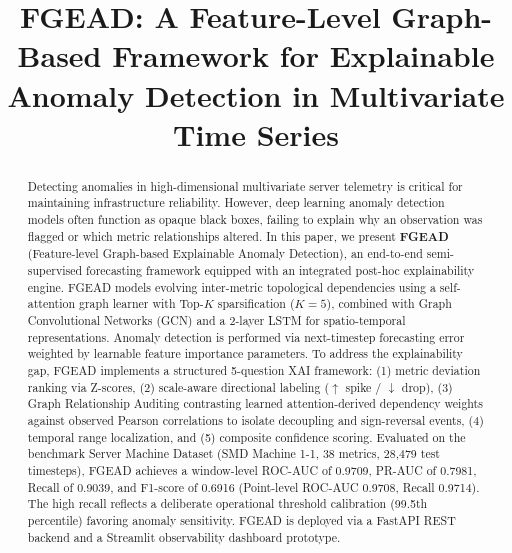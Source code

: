 \documentclass[conference]{IEEEtran}
\begin{document}
\title{FGEAD: A Feature-Level Graph-Based Framework for Explainable Anomaly Detection in Multivariate Time Series}

\author{
\and
{}
\and
{}
}
\maketitle

\begin{abstract}
Detecting anomalies in high-dimensional multivariate server telemetry is critical for maintaining infrastructure reliability. However, deep learning anomaly detection models often function as opaque black boxes, failing to explain why an observation was flagged or which metric relationships altered. In this paper, we present \textbf{FGEAD} (Feature-level Graph-based Explainable Anomaly Detection), an end-to-end semi-supervised forecasting framework equipped with an integrated post-hoc explainability engine. FGEAD models evolving inter-metric topological dependencies using a self-attention graph learner with Top-$K$ sparsification ($K=5$), combined with Graph Convolutional Networks (GCN) and a 2-layer LSTM for spatio-temporal representations. Anomaly detection is performed via next-timestep forecasting error weighted by learnable feature importance parameters. To address the explainability gap, FGEAD implements a structured 5-question XAI framework: (1) metric deviation ranking via Z-scores, (2) scale-aware directional labeling ($\uparrow$ spike / $\downarrow$ drop), (3) Graph Relationship Auditing contrasting learned attention-derived dependency weights against observed Pearson correlations to isolate decoupling and sign-reversal events, (4) temporal range localization, and (5) composite confidence scoring. Evaluated on the benchmark Server Machine Dataset (SMD Machine 1-1, 38 metrics, 28,479 test timesteps), FGEAD achieves a window-level ROC-AUC of 0.9709, PR-AUC of 0.7981, Recall of 0.9039, and F1-score of 0.6916 (Point-level ROC-AUC 0.9708, Recall 0.9714). The high recall reflects a deliberate operational threshold calibration (99.5th percentile) favoring anomaly sensitivity. FGEAD is deployed via a FastAPI REST backend and a Streamlit observability dashboard prototype.
\end{abstract}
\end{document}
